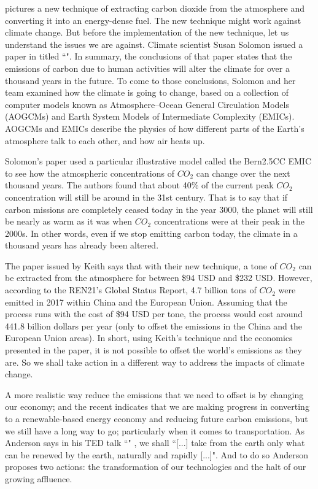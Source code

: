 \documentclass[11pt,a4paper]{article}
\begin{document}
\cite{Keith2018} pictures a new technique of extracting carbon dioxide from the atmosphere and converting it into an energy-dense fuel. The new technique might work against climate change. But before the implementation of the new technique, let us understand the issues we are against. Climate scientist Susan Solomon issued a paper in  titled ``". In summary, the conclusions of that paper states that the emissions of carbon due to human activities will alter the climate for over a thousand years in the future. To come to those conclusions, Solomon and her team examined how the climate is going to change, based on a collection of computer models known as Atmosphere–Ocean General Circulation Models (AOGCMs) and Earth System Models of Intermediate Complexity (EMICs). AOGCMs and EMICs describe the physics of how different parts of the Earth’s atmosphere talk to each other, and how air heats up.

Solomon's paper used a particular illustrative model called the Bern2.5CC EMIC to see how the atmospheric concentrations of $CO_2$ can change over the next thousand years. The authors found that about 40\% of the current peak $CO_2$ concentration will still be around in the 31st century. That is to say that if carbon missions are completely ceased today in the year 3000, the planet will still be nearly as warm as it was when $CO_2$ concentrations were at their peak in the 2000s. In other words, even if we stop emitting carbon today, the climate in a thousand years has already been altered.

The paper issued by Keith says that with their new technique, a tone of $CO_2$ can be extracted from the atmosphere for between \$94 USD and \$232 USD. However, according to the REN21's Global Status Report, 4.7 billion tons of $CO_2$ were emitted in 2017 within China and the European Union. Assuming that the process runs with the cost of \$94 USD per tone, the process would cost around 441.8 billion dollars per year (only to offset the emissions in the China and the European Union areas). In short, using Keith's technique and the economics presented in the paper, it is not possible to offset the world's emissions as they are. So we shall take action in a different way to address the impacts of climate change.

A more realistic way reduce the emissions that we need to offset is by changing our economy; and the recent  \parencite{REN21} indicates that we are making progress in converting to a renewable-based energy economy and reducing future carbon emissions, but we still have a long way to go; particularly when it comes to transportation. As Anderson says in his TED talk ``" \parencite{Anderson2009}, we shall ``[...] take from the earth only what can be renewed by the earth, naturally and rapidly [...]". And to do so Anderson proposes two actions: the transformation of our technologies and the halt of our growing affluence.
\end{document}
